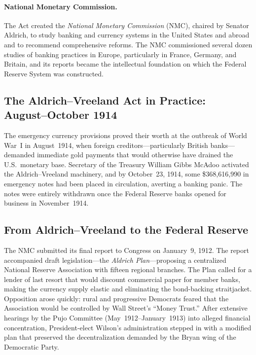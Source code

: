 \documentclass[12pt]{article}
\begin{document}
\paragraph{National Monetary Commission.}  The Act created the \emph{National
Monetary Commission} (NMC), chaired by Senator Aldrich, to study banking and
currency systems in the United States and abroad and to recommend comprehensive
reforms.  The NMC commissioned several dozen studies of banking practices in
Europe, particularly in France, Germany, and Britain, and its reports became the
intellectual foundation on which the Federal Reserve System was constructed.

\subsection{The Aldrich--Vreeland Act in Practice: August--October 1914}

The emergency currency provisions proved their worth at the outbreak of World War~I
in August~1914, when foreign creditors---particularly British banks---demanded
immediate gold payments that would otherwise have drained the U.S.\ monetary base.
Secretary of the Treasury William Gibbs McAdoo activated the Aldrich--Vreeland
machinery, and by October~23, 1914, some \$368{,}616{,}990 in emergency notes had
been placed in circulation, averting a banking panic.  The notes were entirely
withdrawn once the Federal Reserve banks opened for business in November~1914.

\subsection{From Aldrich--Vreeland to the Federal Reserve}

The NMC submitted its final report to Congress on January~9, 1912.  The report
accompanied draft legislation---the \emph{Aldrich Plan}---proposing a
centralized National Reserve Association with fifteen regional branches.  The Plan
called for a lender of last resort that would discount commercial paper for member
banks, making the currency supply elastic and eliminating the bond-backing
straitjacket.  Opposition arose quickly: rural and progressive Democrats feared
that the Association would be controlled by Wall Street's ``Money Trust.''  After
extensive hearings by the Pujo Committee (May~1912--January~1913) into alleged
financial concentration, President-elect Wilson's administration stepped in with
a modified plan that preserved the decentralization demanded by the Bryan wing of
the Democratic Party.
\end{document}
